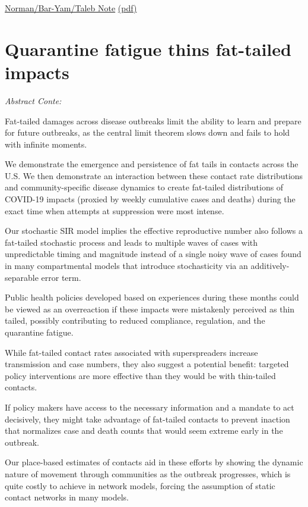 \documentclass[
]{book}
\begin{document}
\href{https://necsi.edu/systemic-risk-of-pandemic-via-novel-pathogens-coronavirus-\%20a-note}{Norman/Bar-Yam/Taleb Note}
\href{/pdf/Joseph_Norman_2020_Systemic_Risk_of_Pandemic_via_Novel_Pathogenes.pdf}{(pdf)}

\hypertarget{quarantine-fatigue-thins-fat-tailed-impacts}{%
\section{Quarantine fatigue thins fat-tailed impacts}\label{quarantine-fatigue-thins-fat-tailed-impacts}}

\emph{Abstract Conte:}

Fat-tailed damages across disease outbreaks limit the
ability to learn and prepare for future outbreaks,
as the central limit theorem slows down and fails
to hold with infinite moments.

We demonstrate the emergence and persistence of fat tails in contacts across the U.S.
We then demonstrate an interaction between these contact rate distributions
and community-specific disease dynamics
to create fat-tailed distributions of COVID-19 impacts
(proxied by weekly cumulative cases and deaths) during the
exact time when attempts at suppression were most intense.

Our stochastic SIR model implies the effective reproductive number
also follows a fat-tailed stochastic process and leads to multiple waves of
cases with unpredictable timing and magnitude instead of a single noisy wave of cases
found in many compartmental models
that introduce stochasticity via an additively-separable error term.

Public health policies developed based on experiences during these months
could be viewed as an overreaction if these impacts were
mistakenly perceived as thin tailed,
possibly contributing to reduced compliance, regulation, and the quarantine fatigue.

While fat-tailed contact rates associated with superspreaders increase transmission
and case numbers, they also suggest a potential benefit: targeted policy
interventions are more effective than they would be with thin-tailed contacts.

If policy makers have access to the necessary information and a mandate to act decisively,
they might take advantage of fat-tailed contacts
to prevent inaction that normalizes case and death counts that
would seem extreme early in the outbreak.

Our place-based estimates of contacts aid in these efforts by showing
the dynamic nature of movement through communities as the outbreak progresses,
which is quite costly to achieve in network models,
forcing the assumption of static contact networks in many models.
\end{document}
